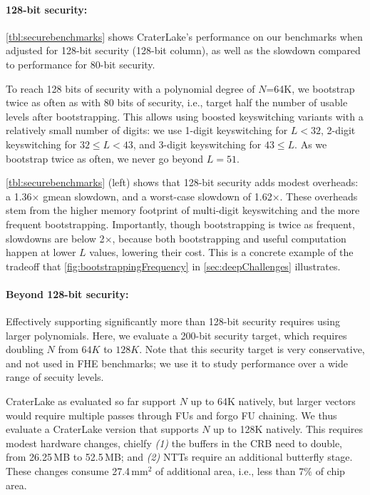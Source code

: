 \paragraph{128-bit security:}
\autoref{tbl:securebenchmarks} shows CraterLake's performance on our benchmarks
when adjusted for 128-bit security (128-bit column), as well as the slowdown
compared to performance for 80-bit security.

\tblSecureBenchmarks

To reach 128 bits of security with a polynomial degree of $N$=64K, we bootstrap
twice as often as with 80 bits of security, i.e., target half the number of
usable levels after bootstrapping. This allows using boosted keyswitching
variants with a relatively small number of digits: we use 1-digit keyswitching
for $L< 32$, 2-digit keyswitching for $32 \leq L< 43$, and 3-digit keyswitching
for $43 \leq L$. As we bootstrap twice as often, we never go beyond $L =51$.

\autoref{tbl:securebenchmarks} (left) shows that 128-bit security adds modest
overheads: a 1.36$\times$ gmean slowdown, and a worst-case slowdown of
1.62$\times$. These overheads stem from the higher memory footprint of
multi-digit keyswitching and the more frequent bootstrapping. Importantly,
though bootstrapping is twice as frequent, slowdowns are below 2$\times$,
because both bootstrapping and useful computation happen at lower $L$ values,
lowering their cost. This is a concrete example of the tradeoff that
\autoref{fig:bootstrappingFrequency} in \autoref{sec:deepChallenges}
illustrates.

\paragraph{Beyond 128-bit security:}
Effectively supporting significantly more than 128-bit security requires using
larger polynomials. Here, we evaluate a 200-bit security target, which requires
doubling $N$ from $64K$ to $128K$. Note that this security target is very
conservative, and not used in FHE benchmarks; we use it to study performance
over a wide range of secuity levels.

CraterLake as evaluated so far support $N$ up to 64K natively, but larger
vectors would require multiple passes through FUs and forgo FU chaining. We
thus evaluate a CraterLake version that supports $N$ up to 128K natively. This
requires modest hardware changes, chielfy \emph{(1)} the buffers in the CRB
need to double, from 26.25$\,$MB to 52.5$\,$MB; and \emph{(2)} NTTs require an
additional butterfly stage. These changes consume 27.4\,mm$^2$ of additional
area, i.e., less than $7\%$ of chip area.

